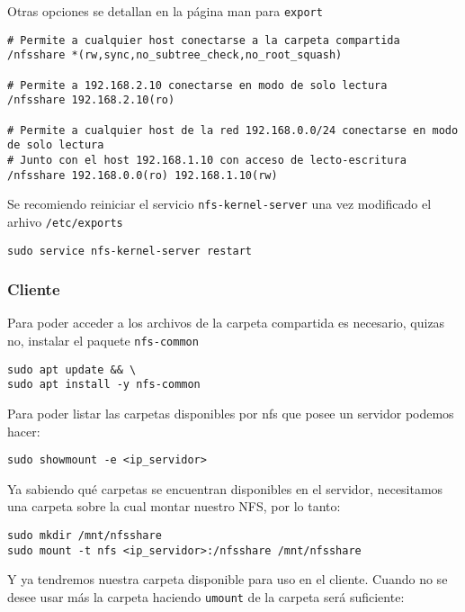     Otras opciones se detallan en la página man para \texttt{export} 

\begin{lstlisting}
# Permite a cualquier host conectarse a la carpeta compartida
/nfsshare *(rw,sync,no_subtree_check,no_root_squash)

# Permite a 192.168.2.10 conectarse en modo de solo lectura
/nfsshare 192.168.2.10(ro)

# Permite a cualquier host de la red 192.168.0.0/24 conectarse en modo de solo lectura
# Junto con el host 192.168.1.10 con acceso de lecto-escritura
/nfsshare 192.168.0.0(ro) 192.168.1.10(rw)
\end{lstlisting}

Se recomiendo reiniciar el servicio \texttt{nfs-kernel-server} una vez modificado el arhivo \texttt{/etc/exports} 

\begin{lstlisting}
sudo service nfs-kernel-server restart
\end{lstlisting}

\subsubsection{Cliente}

Para poder acceder a los archivos de la carpeta compartida es necesario, quizas no, instalar el paquete \texttt{nfs-common} 


\begin{lstlisting}
sudo apt update && \
sudo apt install -y nfs-common
\end{lstlisting}

Para poder listar las carpetas disponibles por nfs que posee un servidor podemos hacer:

\begin{lstlisting}
sudo showmount -e <ip_servidor>
\end{lstlisting}

Ya sabiendo qué carpetas se encuentran disponibles en el servidor, necesitamos una carpeta sobre la cual montar nuestro NFS, por lo tanto:

\begin{lstlisting}
sudo mkdir /mnt/nfsshare
sudo mount -t nfs <ip_servidor>:/nfsshare /mnt/nfsshare
\end{lstlisting}

Y ya tendremos nuestra carpeta disponible para uso en el cliente. Cuando no se desee usar más la carpeta haciendo \texttt{umount} de la carpeta será suficiente:

